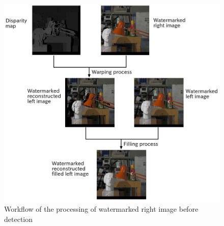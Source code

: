 \begin{figure}[h!]
\centering
\includegraphics[width=1\textwidth]{./img/detection_workflow.png}
\caption{\small{Workflow of the processing of watermarked right image before detection}}
\label{fig:detflow}
\end{figure}

